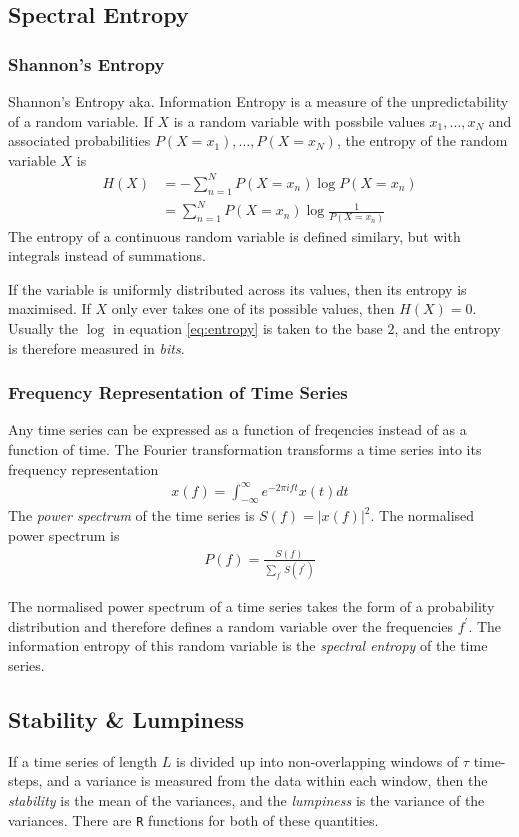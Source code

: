 \documentclass[a4paper,12pt]{article}
\theoremstyle{definition}
\newcommand{\modu}[1]{\left| #1 \right|} %
\begin{document}
\subsection{Spectral Entropy}
\subsubsection{Shannon's Entropy}
Shannon's Entropy aka. Information Entropy is a measure of the unpredictability of a random variable. If $X$ is a random variable with possbile values ${x_1, \dots, x_N}$ and associated probabilities $P(X=x_1), \dots, P(X=x_N)$, the entropy of the random variable $X$ is
\begin{align}
	H(X) 	&= -\sum_{n=1}^N P(X = x_n)\log P(X = x_n) \label{eq:entropy}\\
		&= \sum_{n=1}^N P(X = x_n) \log \frac{1}{P(X=x_n)}
\end{align}
The entropy of a continuous random variable is defined similary, but with integrals instead of summations.

If the variable is uniformly distributed across its values, then its entropy is maximised. If $X$ only ever takes one of its possible values, then $H(X)=0$. Usually the $\log$ in equation \ref{eq:entropy} is taken to the base $2$, and the entropy is therefore measured in \textit{bits}.

\subsubsection{Frequency Representation of Time Series}
Any time series can be expressed as a function of freqencies instead of as a function of time. The Fourier transformation transforms a time series into its frequency representation
\begin{align}
	x(f) = \int_{-\infty}^{\infty} e^{-2\pi i f t}x(t) dt
\end{align}
The \textit{power spectrum} of the time series is $S(f) = \modu{x(f)}^2$. The normalised power spectrum is
\begin{align}
	P(f) = \frac{S(f)}{\sum_{f^{\prime}}S(f^{\prime})}
\end{align}

The normalised power spectrum of a time series takes the form of a probability distribution and therefore defines a random variable over the frequencies $f^{\prime}$. The information entropy of this random variable is the \textit{spectral entropy} of the time series.

\subsection{Stability \& Lumpiness}
If a time series of length $L$ is divided up into non-overlapping windows of $\tau$ time-steps, and a variance is measured from the data within each window, then the \textit{stability} is the mean of the variances, and the \textit{lumpiness} is the variance of the variances. There are \texttt{R} functions for both of these quantities.
\end{document}
